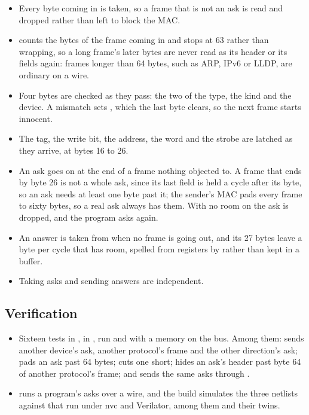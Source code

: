 \begin{itemize}
\item Every byte coming in is taken, so a frame that is not an ask is
read and dropped rather than left to block the MAC.
\item {} counts the bytes of the frame coming in and stops at 63
rather than wrapping, so a long frame's later bytes are never read as
its header or its fields again: frames longer than 64 bytes, such as
ARP, IPv6 or LLDP, are ordinary on a wire.
\item Four bytes are checked as they pass: the two of the type, the
kind and the device. A mismatch sets , which the last byte
clears, so the next frame starts innocent.
\item The tag, the write bit, the address, the word and the strobe are
latched as they arrive, at bytes 16 to 26.
\item An ask goes on  at the end of a frame nothing objected
to. A frame that ends by byte 26 is not a whole ask, since its last
field is held a cycle after its byte, so an ask needs at least one
byte past it; the sender's MAC pads every frame to sixty bytes, so a
real ask always has them. With no room on
 the ask is dropped, and the program asks again.
\item An answer is taken from  when no frame is going out,
and its 27 bytes leave a byte per cycle that  has room,
spelled from registers by  rather than kept in a buffer.
\item Taking asks and sending answers are independent.
\end{itemize}

\subsection*{Verification}

\begin{itemize}
\item Sixteen tests in , in
, run  and
 with a memory on the bus. Among them:
 sends
another device's ask, another protocol's frame and the other
direction's ask;
 pads an ask past 64 bytes;
 cuts one
short;  hides an
ask's header past byte 64 of another protocol's frame; and
 sends the same asks
through .
\item {} runs a program's asks over a
wire, and the build simulates the three netlists against that run under
nvc and Verilator, among them\newline
{}\newline
{}\newline
and their  twins.
\end{itemize}

